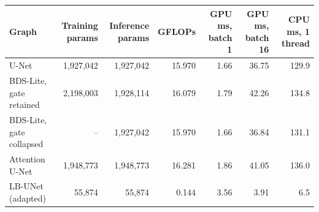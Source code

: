 \begin{tabular}{@{}lrrrrrr@{}}
\toprule
Graph & Training params & Inference params & GFLOPs & GPU ms, batch 1 & GPU ms, batch 16 & CPU ms, 1 thread \\
\midrule
U-Net & 1,927,042 & 1,927,042 & 15.970 & 1.66 & 36.75 & 129.9 \\
BDS-Lite, gate retained & 2,198,003 & 1,928,114 & 16.079 & 1.79 & 42.26 & 134.8 \\
BDS-Lite, gate collapsed & -- & 1,927,042 & 15.970 & 1.66 & 36.84 & 131.1 \\
Attention U-Net & 1,948,773 & 1,948,773 & 16.281 & 1.86 & 41.05 & 136.0 \\
LB-UNet (adapted) & 55,874 & 55,874 & 0.144 & 3.56 & 3.91 & 6.5 \\
\bottomrule
\end{tabular}
